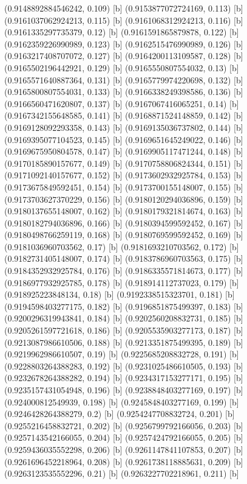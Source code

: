 {{{(0.9148892884546242, 0.109) [b] 
(0.9153877072724169, 0.113) [b] 
(0.9161037062924213, 0.115) [b] 
(0.9161068312924213, 0.116) [b] 
(0.9161335297735379, 0.12) [b] 
(0.9161591865879878, 0.122) [b] 
(0.9162359226990989, 0.123) [b] 
(0.9162515476990989, 0.126) [b] 
(0.9163217408707072, 0.127) [b] 
(0.9164200113109587, 0.128) [b] 
(0.9165502196442921, 0.129) [b] 
(0.9165550807554032, 0.13) [b] 
(0.9165571640887364, 0.131) [b] 
(0.9165779974220698, 0.132) [b] 
(0.9165800807554031, 0.133) [b] 
(0.9166338249398586, 0.136) [b] 
(0.9166560471620807, 0.137) [b] 
(0.9167067416065251, 0.14) [b] 
(0.9167342155648585, 0.141) [b] 
(0.9168871524148859, 0.142) [b] 
(0.9169128092293358, 0.143) [b] 
(0.9169135036737802, 0.144) [b] 
(0.9169395077104523, 0.145) [b] 
(0.9169651645249022, 0.146) [b] 
(0.9169675950804578, 0.147) [b] 
(0.9169905117471244, 0.148) [b] 
(0.9170185890157677, 0.149) [b] 
(0.9170758806824344, 0.151) [b] 
(0.9171092140157677, 0.152) [b] 
(0.9173602932925784, 0.153) [b] 
(0.9173675849592451, 0.154) [b] 
(0.9173700155148007, 0.155) [b] 
(0.9173703627370229, 0.156) [b] 
(0.9180120294036896, 0.159) [b] 
(0.9180137655148007, 0.162) [b] 
(0.9180179321814674, 0.163) [b] 
(0.9180182794036896, 0.166) [b] 
(0.9180394599592452, 0.167) [b] 
(0.9180498766259119, 0.168) [b] 
(0.9180769599592452, 0.169) [b] 
(0.9181036960703562, 0.17) [b] 
(0.9181693210703562, 0.172) [b] 
(0.9182731405148007, 0.174) [b] 
(0.9183786960703563, 0.175) [b] 
(0.9184352932925784, 0.176) [b] 
(0.9186335571814673, 0.177) [b] 
(0.9186977932925785, 0.178) [b] 
(0.918914112737023, 0.179) [b] 
(0.918925223848134, 0.18) [b] 
(0.9192338515323701, 0.181) [b] 
(0.9194598403277175, 0.182) [b] 
(0.9196851875499397, 0.183) [b] 
(0.9200296319943841, 0.184) [b] 
(0.9202560208832731, 0.185) [b] 
(0.9205261597721618, 0.186) [b] 
(0.9205535903277173, 0.187) [b] 
(0.9213087986610506, 0.188) [b] 
(0.9213351875499395, 0.189) [b] 
(0.9219962986610507, 0.19) [b] 
(0.9225685208832728, 0.191) [b] 
(0.9228803264388283, 0.192) [b] 
(0.9231025486610505, 0.193) [b] 
(0.9232678264388282, 0.194) [b] 
(0.9234317153277171, 0.195) [b] 
(0.9235157431054948, 0.196) [b] 
(0.9238848403277169, 0.197) [b] 
(0.924000812549939, 0.198) [b] 
(0.9245848403277169, 0.199) [b] 
(0.9246428264388279, 0.2) [b] 
(0.9254247708832724, 0.201) [b] 
(0.9255216458832721, 0.202) [b] 
(0.9256799792166056, 0.203) [b] 
(0.9257143542166055, 0.204) [b] 
(0.9257424792166055, 0.205) [b] 
(0.9259436035552298, 0.206) [b] 
(0.9261147841107853, 0.207) [b] 
(0.9261696452218964, 0.208) [b] 
(0.9261738118885631, 0.209) [b] 
(0.9263123535552296, 0.21) [b] 
(0.9263227702218961, 0.211) [b] 
}}}
